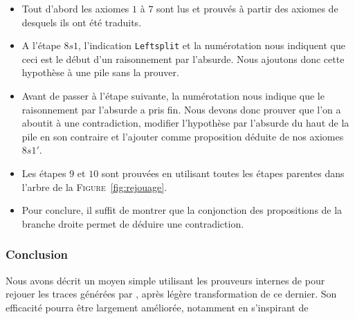 \begin{itemize}
\item Tout d'abord les axiomes $1$ à $7$ sont lus et prouvés à partir des axiomes de \holfour desquels ils ont été traduits.
\item A l'étape $8s1$, l'indication \verb!Leftsplit! et la numérotation nous indiquent que ceci est le début d'un raisonnement par l'absurde. Nous ajoutons donc cette hypothèse à une pile sans la prouver.
\item Avant de passer à l'étape suivante, la numérotation nous indique que le raisonnement par l'absurde a pris fin. Nous devons donc prouver que l'on a aboutit à une contradiction, modifier l'hypothèse par l'absurde du haut de la pile en son contraire et l'ajouter comme proposition déduite de nos axiomes $8s1'$.
\item Les étapes $9$ et $10$ sont prouvées en utilisant toutes les étapes parentes dans l'arbre de la \textsc{Figure}~\ref{fig:rejouage}.
\item Pour conclure, il suffit de montrer que la conjonction des propositions de la branche droite permet de déduire une contradiction.
\end{itemize}


\subsubsection{Conclusion}

Nous avons décrit un moyen simple utilisant les prouveurs internes de
\holfour pour rejouer les traces générées par \beagle, après légère
transformation de ce dernier. Son efficacité pourra être largement
améliorée, notamment en s'inspirant
de~\cite{Paulson10,DBLP:conf/cpp/ArmandFGKTW11}



